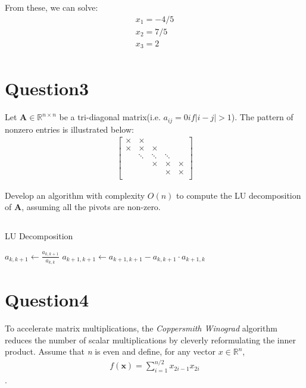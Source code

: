 \documentclass{article}
\newcommand{\R}{\mathbb{R}}
\begin{document}
From these, we can solve:
\begin{align*}
    x_1 = -4/5\\
    x_2 = 7/5\\
    x_3 = 2 \\
\end{align*}

\section*{Question3}
Let \(\bm{A} \in \R^{n \times n}\) be a tri-diagonal matrix(i.e. \(a_{ij} = 0 if |i - j| > 1\)). The pattern of nonzero entries is illustrated below:
\begin{align*}
    \begin{bmatrix}
        \times & \times & & & \\
        \times & \times & \times & & \\
        & \ddots & \ddots & \ddots & \\
        & &  \times & \times &\times \\
        & & & \times & \times \\
    \end{bmatrix}
\end{align*}

\noindent 
Develop an algorithm with complexity \(\textit{O}(n)\) to compute the LU decomposition of \(\bm{A}\), assuming all the pivots are non-zero.

\subsection*{ }

\begin{algorithm}
    \caption{LU Decomposition}
    \begin{algorithmic}[1]
            \State $a_{k,k+1} \gets \frac{a_{k,k+1}}{a_{k,k}}$
            \State $a_{k+1,k+1} \gets a_{k+1,k+1} - a_{k,k+1} \cdot a_{k+1,k}$
        \EndFor
    \end{algorithmic}
\end{algorithm}

\section*{Question4}
To accelerate matrix multiplications, the \textit{Coppersmith Winograd} algorithm reduces the number of scalar multiplications by cleverly reformulating
the inner product. Assume that \textit{n} is even and define, for any vector \(x \in \R^n\),
\begin{align*}
    f(\bm{x}) = \sum_{i = 1}^{n / 2} x_{2i - 1} x_{2i}
\end{align*}.
\end{document}
